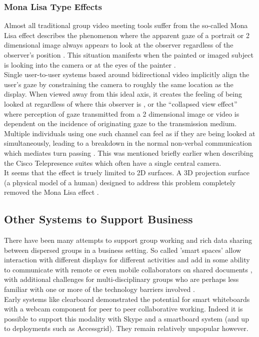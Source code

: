 \subsubsection{Mona Lisa Type Effects}
Almost all traditional group video meeting tools suffer from the so-called Mona Lisa effect describes the phenomenon where the apparent gaze of a portrait or 2 dimensional image always appears to look at the observer regardless of the observer's position \cite{Vishwanath2005, Anstis1969, Wollaston1824}. This situation manifests when the painted or imaged subject is looking into the camera or at the eyes of the painter \cite{Loomis2008, Fullwood2006a}.\\
Single user-to-user systems based around bidirectional video implicitly align the user's gaze by constraining the camera to roughly the same location as the display. When viewed away from this ideal axis, it creates the feeling of being looked at regardless of where this observer is \cite{AlMoubayed2012, Vishwanath2005, Anstis1969, Wollaston1824}, or the ``collapsed view effect'' \cite{Nguyen2005} where perception of gaze transmitted from a 2 dimensional image or video is dependent on the incidence of originating gaze to the transmission medium. \\
Multiple individuals using one such channel can feel as if they are being looked at simultaneously, leading to a breakdown in the normal non-verbal communication which mediates turn passing \cite{Vertegaal2002}. This was mentioned briefly earlier when describing the Cisco Telepresence suites which often have a single central camera.\\
It seems that the effect is truely limited to 2D surfaces. A 3D projection surface (a physical model of a human) designed to address this problem completely removed the Mona Lisa effect \cite{Moubayed2012}.\\
\subsection{Other Systems to Support Business}                  
There have been many attempts to support group working and rich data sharing between dispersed groups in a business setting. So called 'smart spaces' allow interaction with different displays for different activities and add in some ability to communicate with remote or even mobile collaborators on shared documents \cite{Bardram2012}, with additional challenges for multi-disciplinary groups who are perhaps less familiar with one or more of the technology barriers involved \cite{Adamczyk2007}.\\
Early systems like clearboard \cite{Ishii1993} demonstrated the potential for smart whiteboards with a webcam component for peer to peer collaborative working. Indeed it is possible to support this modality with Skype and a smartboard system (and up to deployments such as Accessgrid). They remain relatively unpopular however.\\

